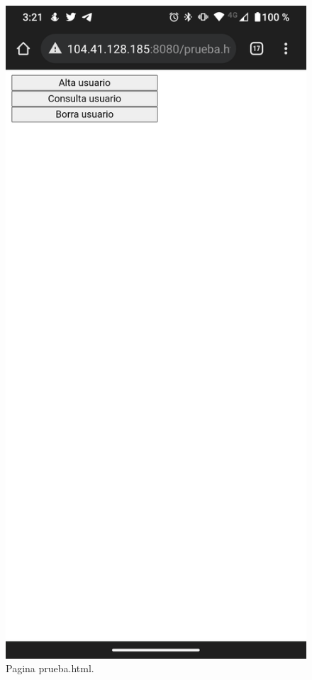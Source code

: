 \documentclass[11pt]{article}
\begin{document}
		\begin{figure}[H]
			\centering
			\includegraphics[scale=0.18]{resources/Screenshot_20211024-152136.png}
			\caption{Pagina prueba.html.}\label{fig:picture}
		\end{figure}
\end{document}
